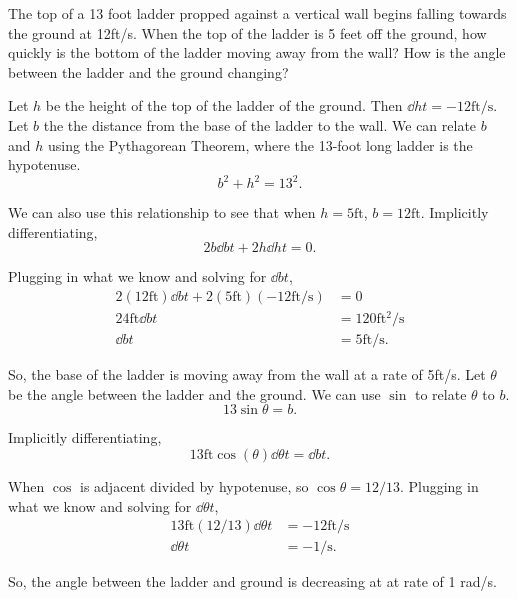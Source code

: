 \begin{example}
	The top of a 13 foot ladder propped against a vertical wall begins falling towards the ground at 12ft/s.
	When the top of the ladder is 5 feet off the ground, how quickly is the bottom of the ladder moving away from the wall?
	How is the angle between the ladder and the ground changing?
\end{example}
\begin{answer}
	Let $h$ be the height of the top of the ladder of the ground.
	Then $\dd{h}{t} = -12\text{ft/s}$.
	Let $b$ the the distance from the base of the ladder to the wall.
	We can relate $b$ and $h$ using the Pythagorean Theorem, where the 13-foot long ladder is the hypotenuse.
	\begin{equation*}
		b^2 + h^2 = 13^2.
	\end{equation*}
	
	We can also use this relationship to see that when $h=5\text{ft}$, $b=12\text{ft}$.
	Implicitly differentiating,
	\begin{equation*}
		2b\dd{b}{t} + 2h\dd{h}{t} = 0.
	\end{equation*}
	
	Plugging in what we know and solving for $\dd{b}{t}$,
	\begin{align*}
		2(12\text{ft})\dd{b}{t} + 2(5\text{ft})(-12\text{ft/s}) &= 0 \\
		24\text{ft}\dd{b}{t} &= 120\text{ft$^2$/s} \\
		\dd{b}{t} &= 5\text{ft/s}.
	\end{align*}
	
	So, the base of the ladder is moving away from the wall at a rate of 5ft/s.
	Let $\theta$ be the angle between the ladder and the ground.
	We can use $\sin$ to relate $\theta$ to $b$.
	\begin{equation*}
		13\sin{\theta} = b.
	\end{equation*}
	
	Implicitly differentiating,
	\begin{equation*}
		13\text{ft}\cos{(\theta)}\dd{\theta}{t} = \dd{b}{t}.
	\end{equation*}
	
	When $\cos$ is adjacent divided by hypotenuse, so $\cos{\theta} = 12/13$.
	Plugging in what we know and solving for $\dd{\theta}{t}$,
	\begin{align*}
		13\text{ft}(12/13)\dd{\theta}{t} &= -12\text{ft/s} \\
		\dd{\theta}{t} &= -1\text{/s}.
	\end{align*}
	
	So, the angle between the ladder and ground is decreasing at at rate of 1 rad/s.
\end{answer}

